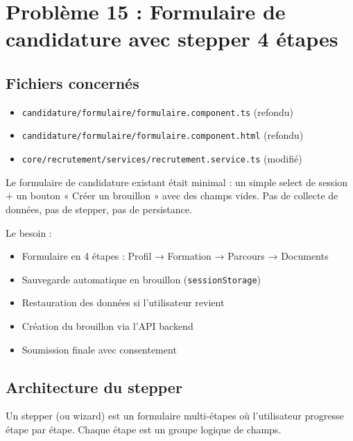\documentclass[a4paper,12pt,french]{article}
\begin{document}
\section{Problème 15 : Formulaire de candidature avec stepper 4 étapes}

\subsection{Fichiers concernés}
\begin{itemize}
    \item \texttt{candidature/formulaire/formulaire.component.ts} (refondu)
    \item \texttt{candidature/formulaire/formulaire.component.html} (refondu)
    \item \texttt{core/recrutement/services/recrutement.service.ts} (modifié)
\end{itemize}

\begin{problembox}
Le formulaire de candidature existant était minimal : un simple select de session + un bouton « Créer un brouillon » avec des champs vides. Pas de collecte de données, pas de stepper, pas de persistance.

Le besoin :
\begin{itemize}
    \item Formulaire en 4 étapes : Profil → Formation → Parcours → Documents
    \item Sauvegarde automatique en brouillon (\texttt{sessionStorage})
    \item Restauration des données si l'utilisateur revient
    \item Création du brouillon via l'API backend
    \item Soumission finale avec consentement
\end{itemize}
\end{problembox}

\subsection{Architecture du stepper}

Un stepper (ou wizard) est un formulaire multi-étapes où l'utilisateur progresse étape par étape. Chaque étape est un groupe logique de champs.
\end{document}

